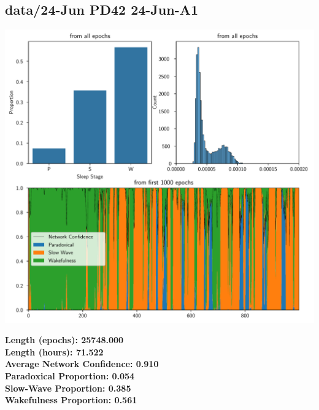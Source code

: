         \subsection*{ data/24-Jun PD42 24-Jun-A1 }
        \begin{center}
        \begin{adjustbox}{width=1\textwidth}
        \includegraphics[page=25]{figs.pdf}
        \end{adjustbox}
        \end{center}
        \large\textbf{Length (epochs): 25748.000}\\
        \textbf{Length (hours): 71.522}\\
        \textbf{Average Network Confidence: 0.910}\\
        \textbf{Paradoxical Proportion: 0.054}\\
        \textbf{Slow-Wave Proportion: 0.385}\\
        \textbf{Wakefulness Proportion: 0.561}\\
        
